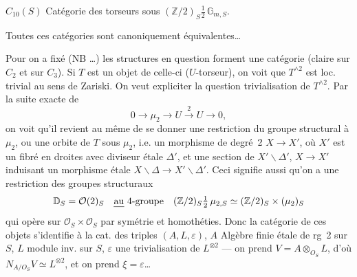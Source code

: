 \documentclass[11pt,a4paper]{article}
\begin{document}

$C_{10}(S)$ Catégorie des torseurs sous $(\mathbb{Z}/2)_S \tfrac{1}{2}\, \mathbb{G}_{m,S}$.

\struck{\ill{}} Toutes ces catégories sont canoniquement équivalentes…

 Pour  on a fixé (NB …) les structures en question forment une \add{\ill{}} catégorie (claire sur $C_2$ et sur $C_3$). Si $T$ est un objet de celle-ci ($U$-torseur), on voit que $T^{\wedge 2}$ est loc. trivial au sens de Zariski.
On veut expliciter la question \struck{\ill{}} trivialisation de $T^{\wedge 2}$. Par la suite exacte de 
\[
  0 \to \mu_2 \to U \xrightarrow{\;2\;} U \to 0 ,
\]
on voit qu'il revient au même de se donner une restriction du groupe structural à $\mu_2$, ou une orbite \struck{\ill{}} de $T$ sous $\mu_2$, i.e. un morphisme de degré~2 $X \to X'$, où $X'$ est un fibré en droites  avec diviseur étale $\Delta'$, et une section \struck{\ill{}} de $X' \smallsetminus \Delta'$, $X \to X'$ induisant un morphisme  étale $X \smallsetminus \Delta \to X' \smallsetminus \Delta'$. Ceci signifie aussi qu'on a une restriction des groupes structuraux
\[
  \mathbb{D}_S = \mathcal{O}(2)_S \quad \text{\uncertain{au} 4-groupe} \quad
  (\mathbb{Z}/2)_S \tfrac{1}{2}\, \mu_{2,S} \simeq (\mathbb{Z}/2)_S \times (\mu_2)_S
\]
qui opère sur $\mathcal{O}_S \times \mathcal{O}_S$ par symétrie et homothéties. Donc la catégorie de ces objets s'identifie à la cat. des triples $(A, L, \varepsilon)$, $A$ Algèbre finie étale de rg~2 sur $S$, $L$ module inv. sur $S$, $\varepsilon$ une trivialisation de $L^{\otimes 2}$ --- on prend $V = A \otimes_{O_S} L$, d'où $N_{A/O_S} V \simeq L^{\otimes 2}$, et on prend $\xi = \varepsilon$…

\end{document}
